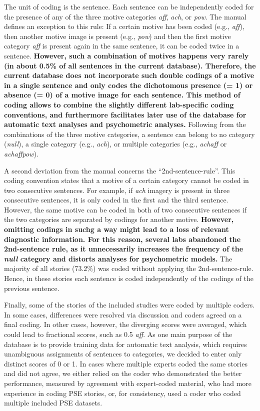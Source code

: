 \documentclass[man,a4paper,mask]{apa6}\usepackage[]{graphicx}\usepackage[]{color}
\newcommand{\added}[1]{\textcolor{colour_added}{\bf{#1}}}
\begin{document}
The unit of coding is the sentence. Each sentence can be independently coded for the presence of any of the three motive categories \emph{aff}, \emph{ach}, or \emph{pow}. The manual defines an exception to this rule: If a certain motive has been coded (e.g., \emph{aff}), then another motive image is present (e.g., \emph{pow}) and then the first motive category \emph{aff} is present again in the same sentence, it can be coded twice in a sentence. \added{However, such a combination of motives happens very rarely (in about 0.5\% of all sentences in the current database). Therefore, the current database does not incorporate such double codings of a motive in a single sentence and only codes the dichotomous presence (= 1) or absence (= 0) of a motive image for each sentence. This method of coding allows to combine the slightly different lab-specific coding conventions, and furthermore facilitates later use of the database for automatic text analyses and psychometric analyses.} 
Following from the combinations of the three motive categories, a sentence can belong to no category (\emph{null}), a single category (e.g., \emph{ach}), or multiple categories (e.g., \emph{achaff} or \emph{achaffpow}).

A second deviation from the manual concerns the ``2nd-sentence-rule''. This coding convention states that a motive of a certain category cannot be coded in two consecutive sentences. For example, if \emph{ach} imagery is present in three consecutive sentences, it is only coded in the first and the third sentence. However, the same motive can be coded in both of two consecutive sentences if the two categories are separated by codings for another motive. 
\added{However, omitting codings in suchg a way might lead to a loss of relevant diagnostic information. For this reason, several labs abandoned the 2nd-sentence rule, as it unnecessarily increases the frequency of the \emph{null} category and distorts analyses for psychometric models.} The majority of all stories (73.2\%) was coded without applying the 2nd-sentence-rule. Hence, in these stories each sentence is coded independently of the codings of the previous sentence.

Finally, some of the stories of the included studies were coded by multiple coders. In some cases, differences were resolved via discussion and coders agreed on a final coding. In other cases, however, the diverging scores were averaged, which could lead to fractional scores, such as 0.5 \emph{aff}. As one main purpose of the database is to provide training data for automatic text analysis, which requires unambiguous assignments of sentences to categories, we decided to enter only distinct scores of 0 or 1. In cases where multiple experts coded the same stories and did not agree, we either relied on the coder who demonstrated the better performance, measured by agreement with expert-coded material, who had more experience in coding PSE stories, or, for consistency, used a coder who coded multiple included PSE datasets.
\end{document}

